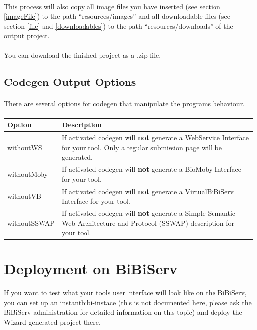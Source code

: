 \documentclass[a4paper,10pt]{book}
\begin{document}
\paragraph{} This process will also copy all image files you have inserted (see section \ref{imageFile}) to the path ``resources/images'' and all downloadable files (see section \ref{file} and \ref{downloadables}) to the path ``resources/downloads'' of the output project.
\paragraph{} You can download the finished project as a .zip file.

\subsection{Codegen Output Options}
\paragraph{} There are several options for codegen that manipulate the programs behaviour.

\paragraph{}
\begin{tabularx}{\textwidth}{lX}
\hline
\textbf{Option} & \textbf{Description}\\
\hline
withoutWS & If activated codegen will \textbf{not} generate a WebService Interface for your tool. Only a regular submission  page will be generated.\\ [0.1cm]
\hline
withoutMoby & If activated codegen will \textbf{not} generate a BioMoby Interface for your tool.\\ [0.1cm]
\hline
withoutVB & If activated codegen will \textbf{not} generate a VirtualBiBiServ Interface for your tool.\\ [0.1cm]
\hline
withoutSSWAP & If activated codegen will \textbf{not} generate a Simple Semantic Web Architecture and Protocol (SSWAP) description for your tool.\\ [0.1cm]
\end{tabularx}

\section{Deployment on BiBiServ}
\label{instantbibi}
\paragraph{} If you want to test what your tools user interface will look like on the BiBiServ, you can set up an instantbibi-instace (this is not documented here, please ask the BiBiServ administration for detailed information on this topic) and deploy the Wizard generated project there.
\end{document}
